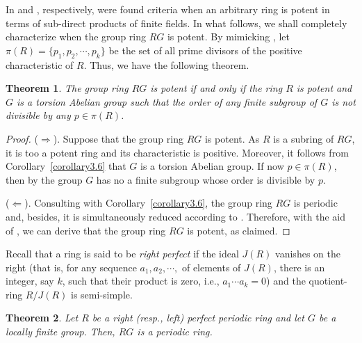 \documentclass[12pt]{amsart}
\newtheorem{thm}{Theorem}[section]
\theoremstyle{definition}
\theoremstyle{remark}
\numberwithin{equation}{section}
\begin{document}
\medskip

In \cite{P} and \cite{DM}, respectively, were found criteria when an arbitrary ring is potent in terms of sub-direct products of finite fields. In what follows, we shall completely characterize when the group ring $RG$ is potent. By mimicking \cite{passman}, let $\pi(R)=\{p_1,p_2, \cdots,p_k \}$ be the set of all prime divisors of the positive characteristic of $R$. Thus, we have the following theorem.

\begin{thm}
The group ring $RG$ is potent if and only if the ring $R$ is potent and $G$ is a torsion Abelian group such that the order of any finite subgroup of $G$ is not divisible by any $p \in \pi(R)$.
\end{thm}

\begin{proof}
($\Rightarrow$). Suppose that the group ring $RG$ is potent. As $R$ is a subring of $RG$, it is too a potent ring and its characteristic is positive. Moreover, it follows from Corollary~\ref{corollary3.6} that $G$ is a torsion Abelian group. If now $p \in \pi(R)$, then by \cite[Theorem III]{passman} the group $G$ has no a finite subgroup whose order is divisible by $p$.

($\Leftarrow$). Consulting with Corollary~\ref{corollary3.6}, the group ring $RG$ is periodic and, besides, it is simultaneously reduced according to \cite[Theorem I]{passman}. Therefore, with the aid of \cite[Theorem 3.4 (1),(2)]{CD}, we can derive that the group ring $RG$ is potent, as claimed.
\end{proof}

Recall that a ring is said to be {\it right perfect} if the ideal $J(R)$ vanishes on the right (that is, for any sequence $a_1, a_2, \cdots ,$ of elements of $J(R)$, there is an integer, say $k$, such that their product is zero, i.e., $a_1\cdots a_k =0$) and the quotient-ring $R/J(R)$ is semi-simple.

\begin{thm}\label{theorem3.7}
Let $R$ be a right (resp., left) perfect periodic ring and let $G$ be a locally finite group. Then, $RG$ is a periodic ring.
\end{thm}
\end{document}

